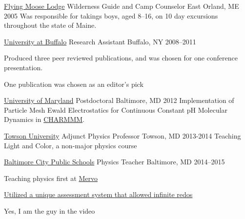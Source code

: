 


\begin{cventries}
  \cventry
    {\href{www.flyingmooselodge.com}{Flying Moose Lodge}}
    {Wilderness Guide and Camp Counselor}
    {East Orland, ME} {2005}
    {Was responsible for takings boys, aged 8--16, on 10 day excursions throughout the state of Maine.}

  \cventry
    {\href{www.buffalo.edu}{University at Buffalo}}
    {Research Assistant}
    {Buffalo, NY} {2008--2011}
    {
    \begin{cvitems}
	  \item {Produced three peer reviewed publications, and was chosen for one conference presentation.}
      \item {One publication was chosen as an editor's pick}
    \end{cvitems}
    }

\cventry
    {\href{www.umaryland.edu}{University of Maryland}}
    {Postdoctoral}
    {Baltimore, MD} {2012}
    {Implementation of Particle Mesh Ewald Electrostatics for Continuous Constant pH Molecular Dynamics in \href{www.charmm.org}{CHARMMM}.} 

\cventry
    {\href{www.towson.edu}{Towson University}}
    {Adjunct Physics Professor}
    {Towson, MD} {2013-2014}
    {Teaching Light and Color, a non-major physics course}

\cventry
    {\href{http://www.baltimorecityschools.org/}{Baltimore City Public Schools}}
    {Physics Teacher}
    {Baltimore, MD} {2014--2015}
    {
    \begin{cvitems}
      \item {Teaching physics first at \href{http://mervo.org}{Mervo}}
      \item {\href{https://github.com/jphafner/physicsAMC}{Utilized a unique assessment system that allowed infinite redos}}
      \item {Yes, I am the guy in the video}
    \end{cvitems}
    }


\end{cventries}
